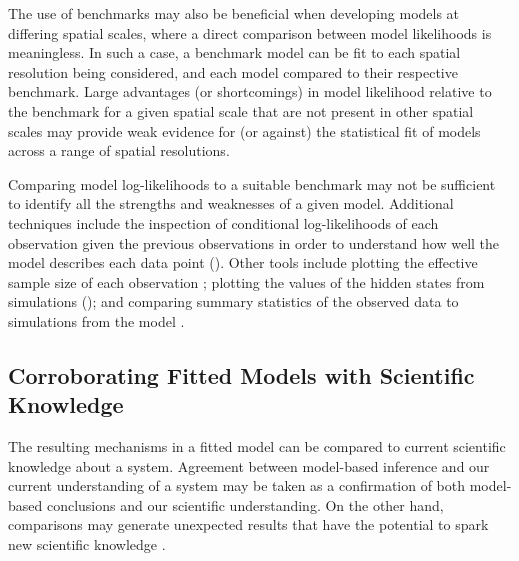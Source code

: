 \documentclass[10pt,letterpaper]{article}\usepackage[]{graphicx}\usepackage[table]{xcolor}
\begin{document}
The use of benchmarks may also be beneficial when developing models at differing spatial scales, where a direct comparison between model likelihoods is meaningless.
In such a case, a benchmark model can be fit to each spatial resolution being considered, and each model compared to their respective benchmark.
Large advantages (or shortcomings) in model likelihood relative to the benchmark for a given spatial scale that are not present in other spatial scales may provide weak evidence for (or against) the statistical fit of models across a range of spatial resolutions.

Comparing model log-likelihoods to a suitable benchmark may not be sufficient to identify all the strengths and weaknesses of a given model.
Additional techniques include the inspection of conditional log-likelihoods of each observation given the previous observations in order to understand how well the model describes each data point ().
Other tools include plotting the effective sample size of each observation \cite{liu01}; plotting the values of the hidden states from simulations ();
and comparing summary statistics of the observed data to simulations from the model \cite{wood10,king15}.

\subsection*{Corroborating Fitted Models with Scientific Knowledge}

The resulting mechanisms in a fitted model can be compared to current scientific knowledge about a system.
Agreement between model-based inference and our current understanding of a system may be taken as a confirmation of both model-based conclusions and our scientific understanding.
On the other hand, comparisons may generate unexpected results that have the potential to spark new scientific knowledge \cite{ganusov16}.
\end{document}
